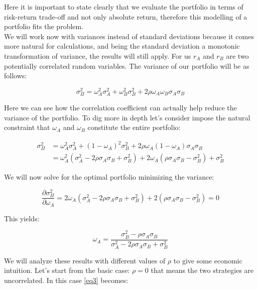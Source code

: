 \documentclass[a4paper]{article}
\numberwithin{equation}{subsection}
\begin{document}
Here it is important to state clearly that we evaluate the portfolio in terms of risk-return trade-off and not only absolute return, therefore this modelling of a portfolio fits the problem.\\
We will work now with variances instead of standard deviations because it comes more natural for calculations, and being the standard deviation a monotonic transformation of variance, the results will still apply. For us $r_A$ and $r_B$ are two potentially correlated random variables. The variance of our portfolio will be as follows:

$$
\sigma^2_\Pi = \omega_A^2 \sigma_A^2 + \omega_B^2 \sigma_B^2 + 2\rho \omega_A \omega_B\sigma_A \sigma_B
$$

Here we can see how the correlation coefficient can actually help reduce the variance of the portfolio. To dig more in depth let's consider impose the natural constraint that $\omega_A$ and $\omega_B$ constitute the entire portfolio:


\begin{equation} \label{eq1}
\begin{split}
\sigma^2_\Pi &= \omega_A^2 \sigma_A^2 + (1 - \omega_A)^2 \sigma_B^2 + 2\rho \omega_A (1 - \omega_A)\sigma_A \sigma_B \\
             & = \omega_A^2(\sigma_A^2 - 2\rho \sigma_A \sigma_B + \sigma_B^2) + 2\omega_A(\rho \sigma_A \sigma_B - \sigma_B^2) + \sigma_B^2
\end{split}
\end{equation}

We will now solve for the optimal portfolio minimizing the variance: 

\begin{equation} \label{eq2}
\frac{\partial \sigma^2_\Pi }{\partial \omega_A} = 2\omega_A(\sigma_A^2 - 2\rho \sigma_A \sigma_B + \sigma_B^2) + 2(\rho \sigma_A \sigma_B - \sigma_B^2) = 0
\end{equation}

This yields:

\begin{equation} \label{eq3}
\omega_A = \frac{\sigma_B^2-\rho \sigma_A \sigma_B}{\sigma_A^2 - 2\rho \sigma_A \sigma_B + \sigma_B^2}
\end{equation}

We will analyze these results with different values of $\rho$ to give some economic intuition. Let's start from the basic case:
$\rho = 0$ that means the two strategies are uncorrelated. In this case \eqref{eq3} becomes:
\end{document}
